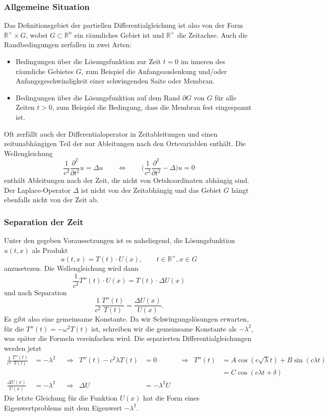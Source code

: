 \subsubsection{Allgemeine Situation}
Das Definitionsgebiet der partiellen Differentialgleichung ist 
also von der Form $\mathbb{R}^+\times G$, wobei $G\subset\mathbb{R}^n$
ein räumliches Gebiet ist und $\mathbb{R}^+$ die Zeitachse.
Auch die Randbedingungen zerfallen in zwei Arten:
\begin{itemize}
\item
Bedingungen über die Lösungsfunktion zur Zeit $t=0$ im inneren des
räumliche Gebietes $G$, zum Beispiel
die Anfangsauslenkung und/oder Anfangsgeschwindigkeit einer schwingenden
Saite oder Membran.
\item
Bedingungen über die Lösungsfunktion auf dem Rand $\partial G$ von
$G$ für alle Zeiten $t>0$, zum Beispiel die Bedingung, dass die
Membran fest eingespannt ist.
\end{itemize}
Oft zerfällt auch der Differentialoperator in Zeitableitungen
und einen zeitunabhängigen Teil der nur Ableitungen nach den
Ortsvariablen enthält.
Die Wellengleichung
\[
\frac{1}{c^2}
\frac{\partial^2}{\partial t^2} u
=
\Delta u
\qquad\Leftrightarrow\qquad
\biggl(
\frac{1}{c^2}\frac{\partial^2}{\partial t^2} - \Delta
\biggr) u = 0
\]
enthält Ableitungen nach der Zeit, die nicht von Ortskoordinaten
abhängig sind.
Der Laplace-Operator $\Delta$ ist nicht von der Zeitabhängig und das
Gebiet $G$ hängt ebenfalls nicht von der Zeit ab.

\subsubsection{Separation der Zeit}
Unter den gegeben Voraussetzungen ist es naheliegend, die Lösungsfunktion
$u(t,x)$ als Produkt
\[
u(t,x) = T(t) \cdot U(x),\qquad t\in\mathbb{R}^+, x\in G
\]
anzusetezen.
Die Wellengleichung wird dann
\[
\frac{1}{c^2}
T''(t)\cdot U(x)
=
T(t)\cdot\Delta U(x)
\]
und nach Separation
\[
\frac{1}{c^2} \frac{T''(t)}{T(t)}
=
\frac{\Delta U(x)}{U(x)}.
\]
Es gibt also eine gemeinsame Konstante.
Da wir Schwingungslösungen erwarten, für die $T''(t) = -\omega^2 T(t)$
ist, schreiben wir die gemeinsame Konstante als $-\lambda^2$, was
später die Formeln vereinfachen wird.
Die separierten Differentialgleichungen werden jetzt
\begin{align*}
\frac{1}{c^2}
\frac{T''(t)}{T(t)}
&=
-\lambda^2
&&\Rightarrow&
T''(t)-c^2\lambda T(t)&=0
&&\Rightarrow&
T''(t) &= A \cos(c\sqrt\lambda t) + B \sin(c \lambda t)
\\
&&&&&&&&
       &= C \cos(c \lambda t+\delta)
\\
\frac{\Delta U(x)}{U(x)}&=-\lambda^2
&&\Rightarrow&
\Delta U &= -\lambda^2 U
\end{align*}
Die letzte Gleichung für die Funktion $U(x)$ hat die Form
eines Eigenwertproblems mit dem Eigenwert $-\lambda^2$.

